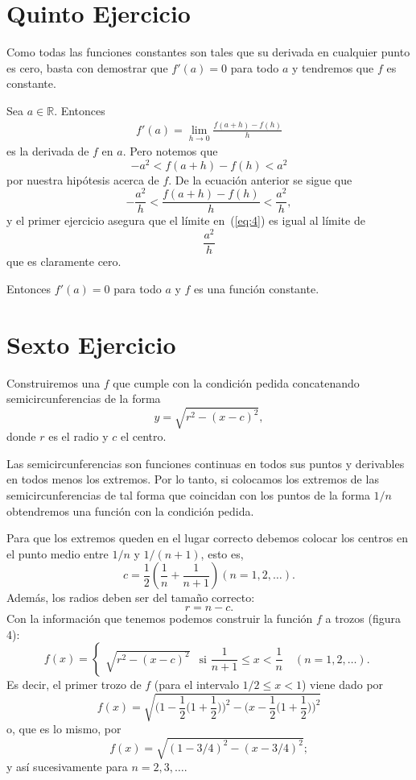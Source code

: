 \documentclass[fleqn,leqno,12pt,letterpaper,final]{article}
\begin{document}
\section{Quinto Ejercicio}%
Como todas las funciones constantes son tales que su derivada en cualquier punto es cero,
basta con demostrar que $f'(a)=0$ para todo $a$ y tendremos que $f$ es constante.

Sea $a\in\mathbb{R}$. Entonces
\begin{align}\label{eq:4}
	f'(a)= \lim_{h\to 0} \frac{f(a+h)-f(h)}{h} 
\end{align}
es la derivada de $f$ en $a$. Pero notemos que
\[
	-a^2<f(a+h)-f(h)<a^2
\]
por nuestra hipótesis acerca de $f$. De la ecuación anterior se sigue que
\[
	-\frac{a^2}{h}< \frac{f(a+h)-f(h)}{h}< \frac{a^2}{h},
\]
y el primer ejercicio asegura que el límite en~(\ref{eq:4}) es igual al límite de
\[
	\frac{a^2}{h} 
\]
que es claramente cero.

Entonces $f'(a)=0$ para todo $a$ y $f$ es una función constante.

\section{Sexto Ejercicio}%
Construiremos una $f$ que cumple con la condición pedida concatenando
semicircunferencias de la forma
\[
	y=\sqrt{r^2-(x-c)^2},
\] 
donde $r$ es el radio y $c$ el centro.

Las semicircunferencias son funciones continuas 
en todos sus puntos y derivables en todos menos los extremos. Por lo tanto,
si colocamos los extremos de las semicircunferencias de tal forma
que coincidan con los puntos de la forma $1/n$ obtendremos
una función con la condición pedida.
%

Para que los extremos queden en el lugar correcto debemos
colocar los centros en el punto medio entre $1/n$ y $1/(n+1)$,
esto es,
\[
	c= \frac{1}{2} \left( \frac{1}{n} + \frac{1}{n+1} \right) (n=1,2,\dots).
\]
Además, los radios deben ser del tamaño correcto:
\[
	r=n-c.
\]
Con la información que tenemos podemos construir la función
$f$ a trozos (figura 4):
\[
	f(x)= \begin{cases}
		\sqrt{r^2-(x-c)^2} &\text{si $\dfrac{1}{n+1}\leq x< \dfrac 1n $}\quad (n=1,2,\dots).
	\end{cases}
\]
Es decir, el primer trozo de $f$ (para el intervalo $1/2\leq x<1$) viene dado por
\[
	f(x)=\sqrt{\biggl(1- \frac{1}{2}\bigl(1+ \frac{1}{2}\bigr)\biggr)^2 - 	\biggl(x-\frac{1}{2}\bigl(1+ \frac{1}{2}\bigr)\biggr)^2}
\]
o, que es lo mismo, por
\[
	f(x)=\sqrt{(1-3/4)^2-(x-3/4)^2};
\]
y así sucesivamente para $n=2,3,\dots$.%
\end{document}
